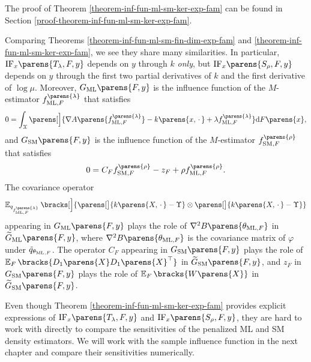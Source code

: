 The proof of Theorem \ref{theorem-inf-fun-ml-sm-ker-exp-fam} can be found in Section \ref{proof-theorem-inf-fun-ml-sm-ker-exp-fam}. 	

Comparing Theorems \ref{theorem-inf-fun-ml-sm-fin-dim-exp-fam} and \ref{theorem-inf-fun-ml-sm-ker-exp-fam}, we see they share many similarities. In particular, $\mathrm{IF}_x \parens{T_{\lambda}, F, y}$ depends on $y$ through $k$ \emph{only}, but $\mathrm{IF}_x \parens{S_{\rho}, F, y}$ depends on $y$ through the first two partial derivatives of $k$ and the first derivative of $\log \mu$. Moreover, $G_{\ML} \parens{F, y}$ is the influence function of the $M$-estimator $f_{\ML, F}^{\parens{\lambda}}$ that satisfies 
\begin{align*}
	0 = \int_{\calX} \parens[\Big]{\nabla A \parens{f_{\ML, F}^{\parens{\lambda}}} - k \parens{x, \,\cdot\,} + \lambda f_{\ML, F}^{\parens{\lambda}}} \diff F \parens{x}, 
\end{align*}
and $G_{\SM} \parens{F, y}$ is the influence function of the $M$-estimator $f_{\SM, F}^{\parens{\rho}}$ that satisfies 
\begin{align*}
	0 = C_F f_{\SM, F}^{\parens{\rho}} - z_{F} + \rho f_{\ML, F}^{\parens{\rho}}. 
\end{align*}
The covariance operator 
\begin{align*}
	\E_{q_{f_{\ML, F}^{\parens{\lambda}}}} \bracks[\Big]{ \parens[\big]{k \parens{X, \,\cdot\,} - \Upsilon } \otimes \parens[\big]{k \parens{X, \,\cdot\,} - \Upsilon }}
\end{align*}
appearing in $G_{\ML} \parens{F, y}$ plays the role of $\nabla^2 B \parens{\theta_{\ML, F} }$ in $\widetilde{G}_{\ML} \parens{F, y}$, where $\nabla^2 B \parens{\theta_{\ML, F} }$ is the covariance matrix of $\varphi$ under $\tilde{q}_{\theta_{\mathrm{ML}, F}}$. The operator $C_F$ appearing in $G_{\SM} \parens{F, y}$ plays the role of $\E_F \bracks{D_1 \parens{X} D_1 \parens{X}^{\top}}$ in $\widetilde{G}_{\SM} \parens{F, y}$, and $z_F$ in $G_{\SM} \parens{F, y}$ plays the role of $\E_F \bracks{W \parens{X}}$ in $\widetilde{G}_{\SM} \parens{F, y}$. 

Even though Theorem \ref{theorem-inf-fun-ml-sm-ker-exp-fam} provides explicit expressions of $\mathrm{IF}_x \parens{T_{\lambda}, F, y}$ and $\mathrm{IF}_x \parens{S_{\rho}, F, y}$, they are hard to work with directly to compare the sensitivities of the penalized ML and SM density estimators. We will work with the sample influence function in the next chapter and compare their sensitivities numerically. 

